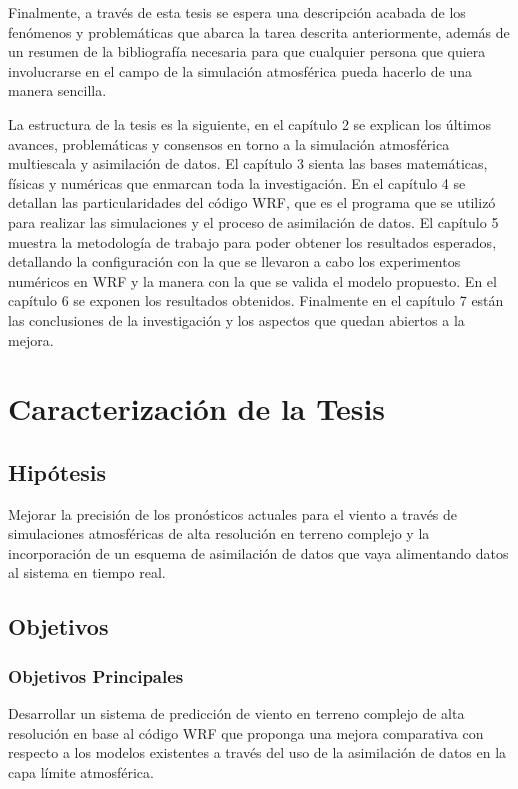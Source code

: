 Finalmente, a través de esta tesis se espera una descripción acabada de los fenómenos y problemáticas que abarca la tarea descrita anteriormente, además de un resumen de la bibliografía necesaria para que cualquier persona que quiera involucrarse en el campo de la simulación atmosférica pueda hacerlo de una manera sencilla. 

La estructura de la tesis es la siguiente, en el capítulo 2 se explican los últimos avances, problemáticas y consensos en torno a la simulación atmosférica multiescala y asimilación de datos. El capítulo 3 sienta las bases matemáticas, físicas y numéricas que enmarcan toda la investigación. En el capítulo 4 se detallan las particularidades del código WRF, que es el programa que se utilizó para realizar las simulaciones y el proceso de asimilación de datos. El capítulo 5 muestra la metodología de trabajo para poder obtener los resultados esperados, detallando la configuración con la que se llevaron a cabo los experimentos numéricos en WRF y la manera con la que se valida el modelo propuesto. En el capítulo 6 se exponen los resultados obtenidos. Finalmente en el capítulo 7 están las conclusiones de la investigación y los aspectos que quedan abiertos a la mejora.

\newpage
\chapter{Caracterización de la Tesis}
\section{Hipótesis}
Mejorar la precisión de los pronósticos actuales para el viento a través de simulaciones atmosféricas de alta resolución en terreno complejo y la incorporación de un esquema de asimilación de datos que vaya alimentando datos al sistema en tiempo real.

\section{Objetivos}
\subsection{Objetivos Principales}
\begin{itemize*}
	\item Desarrollar un sistema de predicción de viento en terreno complejo de alta resolución en base al código WRF que proponga una mejora comparativa con respecto a los modelos existentes a través del uso de la asimilación de datos en la capa límite atmosférica.
\end{itemize*}
